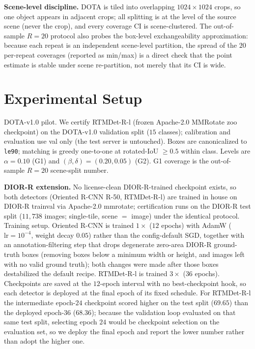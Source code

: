 \documentclass[11pt]{article}
\begin{document}
\textbf{Scene-level discipline.} DOTA is tiled into overlapping $1024\times1024$ crops, so one object appears
in adjacent crops; all splitting is at the level of the source scene (never the crop), and every
coverage CI is scene-clustered. The out-of-sample $R{=}20$ protocol also probes the box-level exchangeability
approximation: because each repeat is an independent scene-level partition, the spread of the $20$ per-repeat
coverages (reported as min/max) is a direct check that the point estimate is stable under scene re-partition,
not merely that its CI is wide.

\section{Experimental Setup}\label{sec:setup}
DOTA-v1.0 pilot. We certify RTMDet-R-l (frozen Apache-2.0 MMRotate \citep{zhou2022mmrotate} zoo checkpoint) on the DOTA-v1.0
\citep{xia2018dota} validation split ($15$ classes); calibration and evaluation use val only (the test server
is untouched). Boxes are canonicalized to \texttt{le90}; matching is greedy one-to-one at rotated-IoU $\ge
0.5$ within class. Levels are $\alpha=0.10$ (G1) and $(\beta,\delta)=(0.20,0.05)$ (G2). G1 coverage is the
out-of-sample $R{=}20$ scene-split number.

\textbf{DIOR-R extension.} No license-clean DIOR-R-trained checkpoint exists, so both detectors (Oriented
R-CNN R-50, RTMDet-R-l) are trained in house on DIOR-R \citep{cheng2022diorr} trainval via Apache-2.0
mmrotate; certification runs on the DIOR-R test split ($11{,}738$ images; single-tile, scene $=$ image) under
the identical protocol. Training setup. Oriented R-CNN is trained $1\times$ ($12$ epochs) with AdamW
($\mathrm{lr}=10^{-4}$, weight decay $0.05$) rather than the config-default SGD, together with an
 annotation-filtering step that drops degenerate zero-area DIOR-R ground-truth boxes
 (removing boxes below a minimum width or height, and images left with no valid ground truth); both changes were made after those boxes destabilized the
default recipe. RTMDet-R-l is trained $3\times$ ($36$ epochs). Checkpoints are saved at the $12$-epoch interval
with no best-checkpoint hook, so each detector is deployed at the final epoch of its fixed schedule.
For RTMDet-R-l the intermediate epoch-$24$ checkpoint scored higher on the test split ($69.65$) than the
deployed epoch-$36$ ($68.36$); because the validation loop evaluated on that same test split, selecting
epoch $24$ would be checkpoint selection on the evaluation set, so we deploy the final epoch and report the
lower number rather than adopt the higher one.
\end{document}
